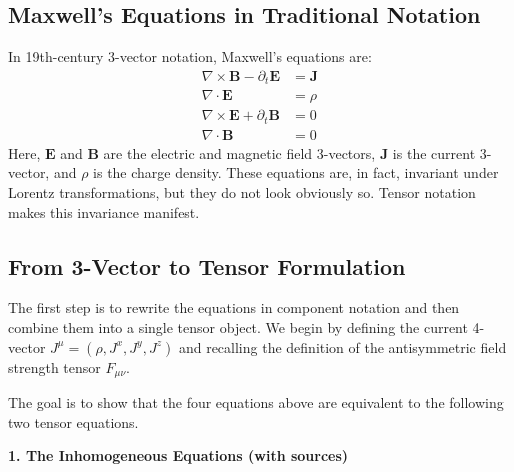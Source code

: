 \documentclass[11pt, a4paper]{report}
\begin{document}
\subsection*{Maxwell's Equations in Traditional Notation}

In 19th-century 3-vector notation, Maxwell's equations are:
\begin{align}
    \nabla \times \mathbf{B} - \partial_t \mathbf{E} &= \mathbf{J} \\
    \nabla \cdot \mathbf{E} &= \rho \\
    \nabla \times \mathbf{E} + \partial_t \mathbf{B} &= 0 \\
    \nabla \cdot \mathbf{B} &= 0
\end{align}
Here, $\mathbf{E}$ and $\mathbf{B}$ are the electric and magnetic field 3-vectors, $\mathbf{J}$ is the current 3-vector, and $\rho$ is the charge density. These equations are, in fact, invariant under Lorentz transformations, but they do not look obviously so. Tensor notation makes this invariance manifest.

\subsection*{From 3-Vector to Tensor Formulation}

The first step is to rewrite the equations in component notation and then combine them into a single tensor object. We begin by defining the current 4-vector $J^\mu = (\rho, J^x, J^y, J^z)$ and recalling the definition of the antisymmetric field strength tensor $F_{\mu\nu}$.

The goal is to show that the four equations above are equivalent to the following two tensor equations.

\textbf{1. The Inhomogeneous Equations (with sources)}
\end{document}
